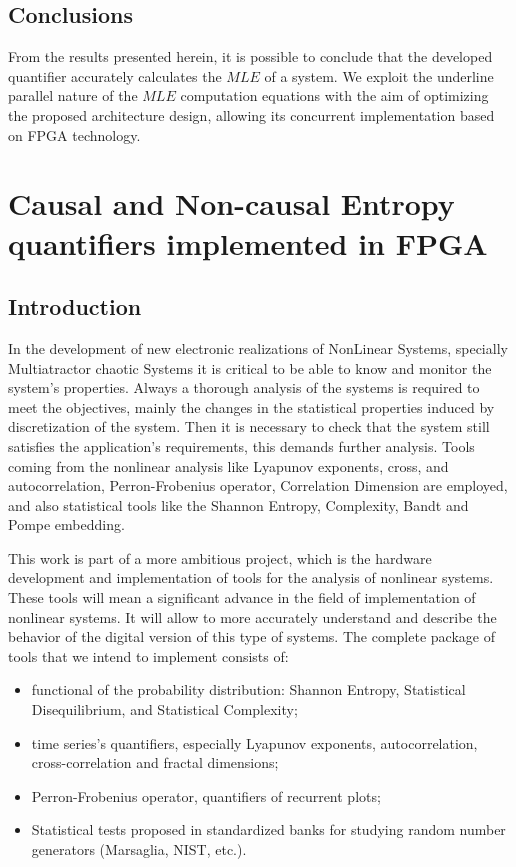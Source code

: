 \subsection{Conclusions}
\label{sec:conclusions}

From the results presented herein, it is possible to conclude that
the developed quantifier accurately calculates the $MLE$ of a
system. We exploit the underline parallel nature of the $MLE$
computation equations with the aim of optimizing the proposed
architecture design, allowing its concurrent implementation based
on FPGA technology.

%
%


\section{Causal and Non-causal Entropy quantifiers implemented in FPGA}

\subsection{Introduction}
\label{sec:Intro}
In the development of new electronic realizations of NonLinear Systems, specially Multiatractor chaotic Systems it is critical to be able to know and monitor the system's properties. Always a thorough analysis of the systems is required to meet the objectives, mainly the changes in the statistical properties induced by discretization of the system. Then it is necessary to check that the system still satisfies the application's requirements, this demands further analysis. Tools coming from the nonlinear analysis like Lyapunov exponents, cross, and autocorrelation, Perron-Frobenius operator, Correlation Dimension are employed, and also statistical tools like the Shannon Entropy, Complexity, Bandt and Pompe
embedding.

This work is part of a more ambitious project, which is the hardware development and implementation of tools for the analysis of nonlinear systems. These tools will mean a significant advance in the field of implementation of nonlinear systems. It will allow to more accurately understand and describe the behavior of the digital version of this type of systems. The complete package of tools that we intend to implement consists of:
\begin{itemize}
\item functional of the probability distribution: Shannon Entropy, Statistical Disequilibrium, and Statistical Complexity;
\item time series's quantifiers, especially Lyapunov exponents, autocorrelation, cross-correlation and fractal dimensions;
\item Perron-Frobenius operator, quantifiers of recurrent plots;
\item Statistical tests proposed in standardized banks for studying random number generators (Marsaglia, NIST, etc.).
\end{itemize}

